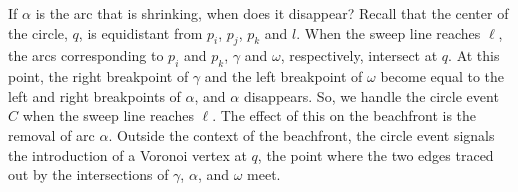 \documentclass[12pt,twoside]{reedthesis}
\begin{document}
        If $\alpha$ is the arc that is shrinking, when does it disappear? Recall that the center of the circle, $q$, is equidistant from $p_{i}$, $p_{j}$, $p_{k}$ and $l$. When the sweep line reaches $\ell$, the arcs corresponding to $p_{i}$ and $p_{k}$, $\gamma$ and $\omega$, respectively, intersect at $q$. At this point, the right breakpoint of $\gamma$ and the left breakpoint of $\omega$ become equal to the left and right breakpoints of $\alpha$, and $\alpha$ disappears. So, we handle the circle event $C$ when the sweep line reaches $\ell$. The effect of this on the beachfront is the removal of arc $\alpha$. Outside the context of the beachfront, the circle event signals the introduction of a Voronoi vertex at $q$, the point where the two edges traced out by the intersections of $\gamma$, $\alpha$, and $\omega$ meet.\par

\end{document}
